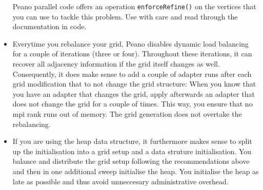 \begin{itemize}
\begin{remark}
    Peano parallel code offers an operation \texttt{enforceRefine()} on
    the vertices that you can use to tackle this problem. Use with care and 
    read through the documentation in code.
  \end{remark}
  \item Everytime you rebalance your grid, Peano disables dynamic load balancing
  for a couple of iterations (three or four). Throughout these iterations, it
  can recover all adjacency information if the grid itself changes as well.
  Consequently, it does make sense to add a couple of adapter runs after each
  grid modification that to not change the grid structure: When you know that
  you have an adapter that changes the grid, apply afterwards an adapter that
  does not change the grid for a couple of times. This way, you ensure that no
  mpi rank runs out of memory. The grid generation does not overtake the rebalancing.
  \item If you are using the heap data structure, it furthermore makes sense to split up
the initialisation into a grid setup and a data struture initialisation.
You balance and distribute the grid setup following the recommendations above
and then in one additional sweep initialise the heap.
You initialise the heap as late as possible and thus avoid unneccesary
administrative overhead.
\end{itemize}
